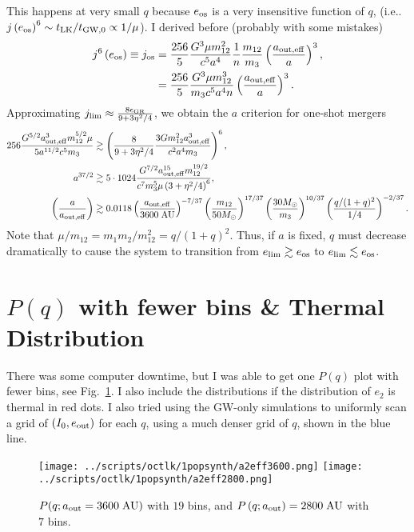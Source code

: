 \documentclass[11pt,
        usenames, %
        dvipsnames %
    ]{article}
\newcommand*{\p}[1]{\left(#1\right)}
\begin{document}
This happens at very small $q$ because $e_{\rm os}$ is a very insensitive
function of $q$, (i.e..\ $j\p{e_{\rm os}}^6 \sim t_{\rm LK} / t_{\rm GW, 0}
\propto 1/\mu$). I derived before (probably with some mistakes)
\begin{align}
    j^6\p{e_{\rm os}} \equiv j_{\rm os}
        &= \frac{256}{5}\frac{G^3 \mu m_{12}^2}{c^5a^4}
            \frac{1}{n}\frac{m_{12}}{m_3}\p{\frac{a_{\rm out,
            eff}}{a}}^3,\\
        &= \frac{256}{5}\frac{G^3 \mu m_{12}^3}{m_3c^5a^4n}
            \p{\frac{a_{\rm out, eff}}{a}}^3.
\end{align}
Approximating $j_{\lim} \approx \frac{8\epsilon_{\rm GR}}{9 + 3\eta^2/4}$, we
obtain the $a$ criterion for one-shot mergers
\begin{align}
    256 \frac{G^{5/2}a_{\rm out, eff}^3 m_{12}^{5/2}\mu}{
        5a^{11/2}c^5 m_3}
        &\gtrsim \p{\frac{8}{9 + 3\eta^2/4}
            \frac{3Gm_{12}^2a_{\rm out, eff}^3}{c^2a^4m_3}}^6,\\
    a^{37/2} &\gtrsim 5 \cdot 1024 \frac{G^{7/2}a_{\rm out, eff}^{15}
        m_{12}^{19/2}}{c^7 m_3^5 \mu \p{3 + \eta^2/4}^6},\\
    \p{\frac{a}{a_{\rm out, eff}}} &\gtrsim
        0.0118
        \p{\frac{a_{\rm out, eff}}{3600\;\mathrm{AU}}}^{-7/37}
        \p{\frac{m_{12}}{50M_{\odot}}}^{17/37}
        \p{\frac{30M_{\odot}}{m_3}}^{10/37}
        \p{\frac{q / (1 + q)^2}{1/4}}^{-2/37}.
\end{align}
Note that $\mu / m_{12} = m_1m_2 / m_{12}^2 = q / (1 + q)^2$. Thus, if $a$ is
fixed, $q$ must decrease dramatically to cause the system to transition from
$e_{\lim} \gtrsim e_{\rm os}$ to $e_{\lim} \lesssim e_{\rm os}$.


\section{$P(q)$ with fewer bins \& Thermal Distribution}

There was some computer downtime, but I was able to get one $P(q)$ plot with
fewer bins, see Fig.~\ref{fig:popsynths}. I also include the distributions if
the distribution of $e_2$ is thermal in red dots. I also tried using the GW-only
simulations to uniformly scan a grid of $(I_0, e_{\rm out})$ for each $q$, using
a much denser grid of $q$, shown in the blue line.
\begin{figure}
    \centering
    \texttt{[image: ../scripts/octlk/1popsynth/a2eff3600.png]}
    \texttt{[image: ../scripts/octlk/1popsynth/a2eff2800.png]}
    \caption{$P(q; a_{\rm out} = 3600\;\mathrm{AU})$ with $19$ bins, and $P\p{q;
    a_{\rm out}} = 2800\;\mathrm{AU}$ with $7$ bins.}\label{fig:popsynths}
\end{figure}
\end{document}
